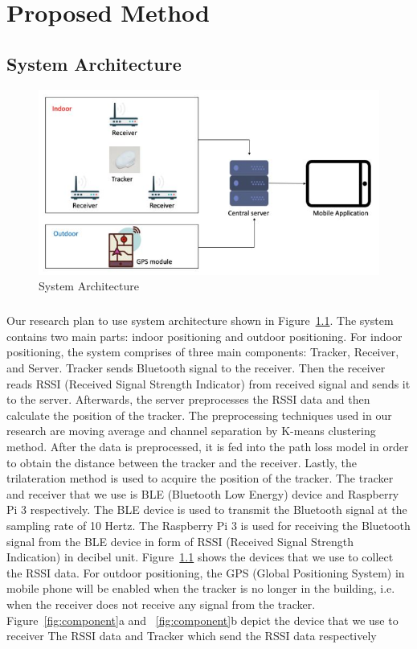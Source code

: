 \chapter{Proposed Method}
\section{System Architecture}
\begin{figure}[h]
\centering
\includegraphics[width=\textwidth]{Image/System_Arch.JPG}
\caption{System Architecture}
\label{fig:system arch}
\end{figure}




\paragraph{}Our research plan to use system architecture shown in Figure~\ref{fig:system arch}. The system contains two main parts: indoor positioning and outdoor positioning. For indoor positioning, the system comprises of three main components: Tracker, Receiver, and Server. Tracker sends Bluetooth signal to the receiver. Then the receiver reads RSSI (Received Signal Strength Indicator) from received signal and sends it to the server. Afterwards, the server preprocesses the RSSI data and then calculate the position of the tracker. The preprocessing techniques used in our research are moving average and channel separation by K-means clustering method. After the data is preprocessed, it is fed into the path loss model in order to obtain the distance between the tracker and the receiver. Lastly, the trilateration method is used to acquire the position of the tracker. The tracker and receiver that we use is BLE (Bluetooth Low Energy) device and Raspberry Pi 3 respectively. The BLE device is used to transmit the Bluetooth signal at the sampling rate of 10 Hertz. The Raspberry Pi 3 is used for receiving the Bluetooth signal from the BLE device in form of RSSI (Received Signal Strength Indication) in decibel unit. Figure~\ref{fig:system arch} shows the devices that we use to collect the RSSI data. For outdoor positioning, the GPS (Global Positioning System) in mobile phone will be enabled when the tracker is no longer in the building, i.e. when the receiver does not receive any signal from the tracker. Figure~\ref{fig:component}a and ~\ref{fig:component}b depict the  device that we use to receiver The RSSI data and Tracker which send the RSSI data respectively  

